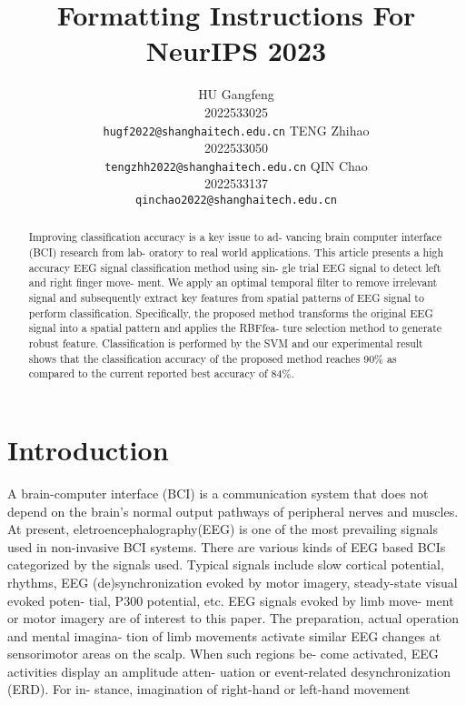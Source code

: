 \documentclass{article}
\title{Formatting Instructions For NeurIPS 2023}
\author {
  HU Gangfeng \\ 2022533025 \\ \texttt{hugf2022@shanghaitech.edu.cn}
  \And
  TENG Zhihao \\ 2022533050 \\ \texttt{tengzhh2022@shanghaitech.edu.cn}
  \And
  QIN Chao \\ 2022533137 \\\texttt{qinchao2022@shanghaitech.edu.cn}
}
\begin{document}
\maketitle


\begin{abstract}
  Improving classiﬁcation accuracy is a key issue to ad- vancing brain computer interface (BCI) research from lab- oratory to real world applications. 
This article presents a high accuracy EEG signal classiﬁcation method using sin- gle trial EEG signal to detect left and right ﬁnger move- ment. 
We apply an optimal temporal ﬁlter to remove  irrelevant signal and subsequently extract key features from spatial patterns of EEG signal to perform classiﬁcation. 
Speciﬁcally, the proposed method transforms the original EEG signal into a spatial pattern and applies the RBFfea- ture selection method to generate robust feature. 
Classiﬁcation is performed by the SVM and our experimental result shows that the classiﬁcation accuracy of the proposed method reaches 90\% as compared to the current reported best accuracy of 84\%.
\end{abstract}


\section{Introduction}

A brain-computer interface (BCI) is a communication system that does not depend on the brain's normal output pathways of peripheral nerves and muscles. At present, eletroencephalography(EEG) is one of the most prevailing signals used in non-invasive BCI systems.
There are various kinds of EEG based  BCIs  categorized by the signals used. Typical signals include slow cortical potential, rhythms, EEG (de)synchronization evoked by motor imagery, steady-state visual evoked poten- tial, P300 potential, etc. EEG signals evoked by limb move- ment or motor imagery are of interest to this paper.
The preparation, actual operation and mental imagina- tion of limb movements activate similar EEG changes at sensorimotor areas on the  scalp. When  such regions be- come activated, EEG activities display an amplitude atten- uation or event-related desynchronization (ERD). For in- stance, imagination of right-hand or left-hand movement
\end{document}
